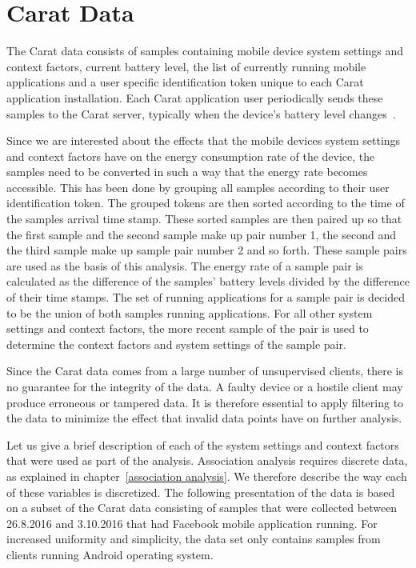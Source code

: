 \section{Carat Data} \label{carat data}

The Carat data consists of samples containing mobile device system settings and context factors, current battery level, the list of currently running mobile applications and a user specific identification token unique to each Carat application installation. Each Carat application user periodically sends these samples to the Carat server, typically when the device's battery level changes~\cite{Oliner:2013:CCE:2517351.2517354}. 

Since we are interested about the effects that the mobile devices system settings and context factors have on the energy consumption rate of the device, the samples need to be converted in such a way that the energy rate becomes accessible. This has been done by grouping all samples according to their user identification token. The grouped tokens are then sorted according to the time of the samples arrival time stamp. These sorted samples are then paired up so that the first sample and the second sample make up pair number 1, the second and the third sample make up sample pair number 2 and so forth. These sample pairs are used as the basis of this analysis. The energy rate of a sample pair is calculated as the difference of the samples' battery levels divided by the difference of their time stamps. The set of running applications for a sample pair is decided to be the union of both samples running applications. For all other system settings and context factors, the more recent sample of the pair is used to determine the context factors and system settings of the sample pair.

Since the Carat data comes from a large number of unsupervised clients, there is no guarantee for the integrity of the data. A faulty device or a hostile client may produce erroneous or tampered data. It is therefore essential to apply filtering to the data to minimize the effect that invalid data points have on further analysis. 

Let us give a brief description of each of the system settings and context factors that were used as part of the analysis. Association analysis requires discrete data, as explained in chapter~\ref{association analysis}. We therefore describe the way each of these variables is discretized. The following presentation of the data is based on a subset of the Carat data consisting of samples that were collected between 26.8.2016 and 3.10.2016 that had Facebook mobile application running. For increased uniformity and simplicity, the data set only contains samples from clients running Android operating system. 

